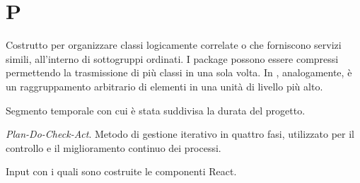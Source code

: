 
\section{P}

Costrutto per organizzare classi logicamente correlate o che forniscono servizi simili, all'interno di sottogruppi ordinati. I package possono essere compressi permettendo la trasmissione di più classi in una sola volta. In , analogamente, è un raggruppamento arbitrario di elementi in una unità di livello più alto.

Segmento temporale con cui è stata suddivisa la durata del progetto.

\textit{Plan-Do-Check-Act}. Metodo di gestione iterativo in quattro fasi, utilizzato per il controllo e il miglioramento continuo dei processi.


	Input con i quali sono costruite le componenti React. 

